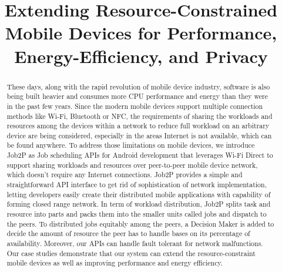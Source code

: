 \documentclass[conference]{IEEEtran}
\begin{document}
%
\title{Extending Resource-Constrained Mobile Devices for Performance, Energy-Efficiency, and Privacy}


\author{
\and
{}
}


\maketitle

\begin{abstract}
These days, along with the rapid revolution of mobile device industry, software is also being built heavier and consumes more CPU performance and energy than they were in the past few years. Since the modern mobile devices support multiple connection methods like Wi-Fi, Bluetooth or NFC, the requirements of sharing the workloads and resources among the devices within a network to reduce full workload on an arbitrary device are being considered, especially in the areas Internet is not available, which can be found anywhere. To address those limitations on mobile devices, we introduce Job2P as Job scheduling APIs for Android development that leverages Wi-Fi Direct to support sharing workloads and resources over peer-to-peer mobile device network, which doesn't require any Internet connections. Job2P provides a simple and straightforward API interface to get rid of sophistication of network implementation, letting developers easily create their distributed mobile applications with capability of forming closed range network. In term of workload distribution, Job2P splits task and resource into parts and packs them into the smaller units called jobs and dispatch to the peers. To distributed jobs equitably among the peers, a Decision Maker is added to decide the amount of resource the peer has to handle bases on its percentage of availability. Moreover, our APIs can handle fault tolerant for network malfunctions. Our case studies demonstrate that our system can extend the resource-constraint mobile devices as well as improving performance and energy efficiency. 
\end{abstract}
\end{document}
